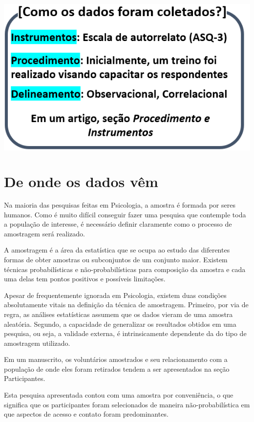 \documentclass[
]{book}
\begin{document}
\includegraphics{./img/cap_pesquisa_aplicada_como.png}

\hypertarget{de-onde-os-dados-vuxeam}{%
\section{De onde os dados vêm}\label{de-onde-os-dados-vuxeam}}

Na maioria das pesquisas feitas em Psicologia, a amostra é formada por seres humanos. Como é muito difícil conseguir fazer uma pesquisa que contemple toda a população de interesse, é necessário definir claramente como o processo de amostragem será realizado.

A amostragem é a área da estatística que se ocupa ao estudo das diferentes formas de obter amostras ou subconjuntos de um conjunto maior. Existem técnicas probabilísticas e não-probabilísticas para composição da amostra e cada uma delas tem pontos positivos e possíveis limitações.

Apesar de frequentemente ignorada em Psicologia, existem duas condições absolutamente vitais na definição da técnica de amostragem. Primeiro, por via de regra, as análises estatísticas assumem que os dados vieram de uma amostra aleatória. Segundo, a capacidade de generalizar os resultados obtidos em uma pesquisa, ou seja, a validade externa, é intrinsicamente dependente da do tipo de amostragem utilizado.

Em um manuscrito, os voluntários amostrados e seu relacionamento com a população de onde eles foram retirados tendem a ser apresentados na seção Participantes.

Esta pesquisa apresentada contou com uma amostra por conveniência, o que significa que os participantes foram selecionados de maneira não-probabilística em que aspectos de acesso e contato foram predominantes.
\end{document}
